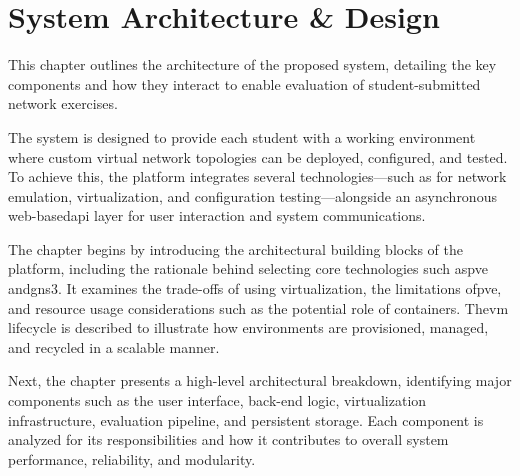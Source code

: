
\chapter{System Architecture \& Design}


\label{Chapter4SystemArchitectureDesign}


This chapter outlines the architecture of the proposed system, detailing the key components and how they interact to enable 
evaluation of student-submitted network exercises.

The system is designed to provide each student with a working environment where custom virtual network topologies can be 
deployed, configured, and tested. To achieve this, the platform integrates several technologies—such as for network 
emulation, virtualization, and configuration testing—alongside an asynchronous web-based\ac{api} layer for 
user interaction and system communications.

The chapter begins by introducing the architectural building blocks of the platform, including the rationale behind selecting 
core technologies such as\ac{pve} and\ac{gns3}. It examines the trade-offs of using virtualization, the limitations of\ac{pve}, 
and resource usage considerations such as the potential role of containers. The\ac{vm} lifecycle is described to illustrate 
how environments are provisioned, managed, and recycled in a scalable manner.

Next, the chapter presents a high-level architectural breakdown, identifying major components such as the user interface, back-end logic, 
virtualization infrastructure, evaluation pipeline, and persistent storage. Each component is analyzed for its responsibilities and how 
it contributes to overall system performance, reliability, and modularity.

